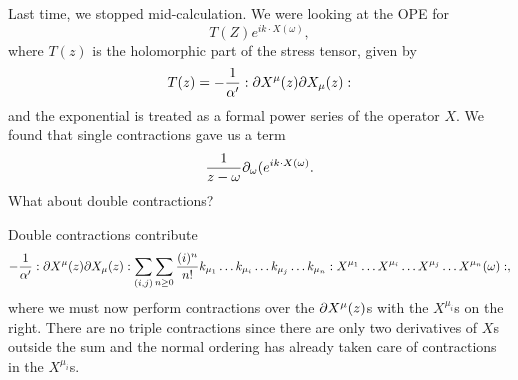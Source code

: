 Last time, we stopped mid-calculation. We were looking at the OPE for
\begin{equation}
    T(Z) e^{ik\cdot X(\omega)},
\end{equation}
where $T(z)$ is the holomorphic part of the stress tensor, given by
\begin{equation}
    T(z)=-\frac{1}{\alpha'}:\partial X^\mu(z) \partial X_\mu(z):
\end{equation}
and the exponential is treated as a formal power series of the operator $X$.
We found that single contractions gave us a term
\begin{equation}
    \frac{1}{z-\omega} \partial_\omega(e^{ik\cdot X(\omega)}.
\end{equation}
What about double contractions?

Double contractions contribute
\begin{equation}
    -\frac{1}{\alpha'}:\partial X^\mu(z) \partial X_\mu(z): \sum_{(i,j)} \sum_{n\geq 0} \frac{(i)^n}{n!} k_{\mu_1}\ldots k_{\mu_i}\ldots k_{\mu_j}\ldots k_{\mu_n} :X^{\mu_1}\ldots X^{\mu_i}\ldots X^{\mu_j} \ldots X^{\mu_n}(\omega):,
\end{equation}
where we must now perform contractions over the $\partial X^\mu(z)$s with the $X^{\mu_i}$s on the right. There are no triple contractions since there are only two derivatives of $X$s outside the sum and the normal ordering has already taken care of contractions in the $X^{\mu_i}$s.

